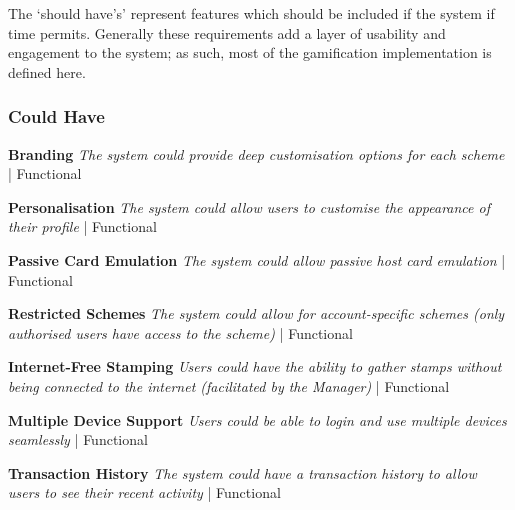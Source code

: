 The `should have's' represent features which should be included if the system if time permits. Generally these requirements add a layer of usability and engagement to the system; as such, most of the gamification implementation is defined here.

\subsubsection{Could Have}
\begin{description}[leftmargin=!,labelwidth=\widthof{\bfseries Medium}]
    \item[C1] \textbf{Branding} \newline
        \textit{The system could provide deep customisation options for each scheme}  | Functional
        
    \item[C2] \textbf{Personalisation} \newline
        \textit{The system could allow users to customise the appearance of their profile}  | Functional
        
    \item[C3] \textbf{Passive Card Emulation} \newline
        \textit{The system could allow passive host card emulation}  | Functional
        
    \item[C4] \textbf{Restricted Schemes} \newline
        \textit{The system could allow for account-specific schemes (only authorised users have access to the scheme)}  | Functional
        
    \item[C5] \textbf{Internet-Free Stamping} \newline
        \textit{Users could have the ability to gather stamps without being connected to the internet (facilitated by the Manager)}  | Functional
        
    \item[C6] \textbf{Multiple Device Support} \newline
        \textit{Users could be able to login and use multiple devices seamlessly}  | Functional
        
    \item[C7] \textbf{Transaction History} \newline
        \textit{The system could have a transaction history to allow users to see their recent activity}  | Functional
\end{description}

